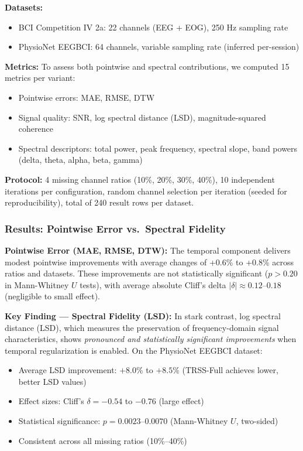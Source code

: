 \textbf{Datasets:}
\begin{itemize}
  \item BCI Competition IV 2a: 22 channels (EEG + EOG), 250 Hz sampling rate
  \item PhysioNet EEGBCI: 64 channels, variable sampling rate (inferred per-session)
\end{itemize}

\textbf{Metrics:} To assess both pointwise and spectral contributions, we computed 15 metrics per variant:
\begin{itemize}
  \item Pointwise errors: MAE, RMSE, DTW
  \item Signal quality: SNR, log spectral distance (LSD), magnitude-squared coherence
  \item Spectral descriptors: total power, peak frequency, spectral slope, band powers (delta, theta, alpha, beta, gamma)
\end{itemize}

\textbf{Protocol:} 4 missing channel ratios (10\%, 20\%, 30\%, 40\%), 10 independent iterations per configuration, random channel selection per iteration (seeded for reproducibility), total of 240 result rows per dataset.

\subsubsection{Results: Pointwise Error vs.\ Spectral Fidelity}

\textbf{Pointwise Error (MAE, RMSE, DTW):} The temporal component delivers modest pointwise improvements with average changes of +0.6\% to +0.8\% across ratios and datasets. These improvements are not statistically significant ($p > 0.20$ in Mann-Whitney $U$ tests), with average absolute Cliff's delta $|\delta| \approx 0.12$--$0.18$ (negligible to small effect).

\textbf{Key Finding --- Spectral Fidelity (LSD):} In stark contrast, log spectral distance (LSD), which measures the preservation of frequency-domain signal characteristics, shows \textit{pronounced and statistically significant improvements} when temporal regularization is enabled. On the PhysioNet EEGBCI dataset:

\begin{itemize}
  \item Average LSD improvement: $+8.0\%$ to $+8.5\%$ (TRSS-Full achieves lower, better LSD values)
  \item Effect sizes: Cliff's $\delta = -0.54$ to $-0.76$ (large effect)
  \item Statistical significance: $p = 0.0023$--$0.0070$ (Mann-Whitney $U$, two-sided)
  \item Consistent across all missing ratios (10\%--40\%)
\end{itemize}

